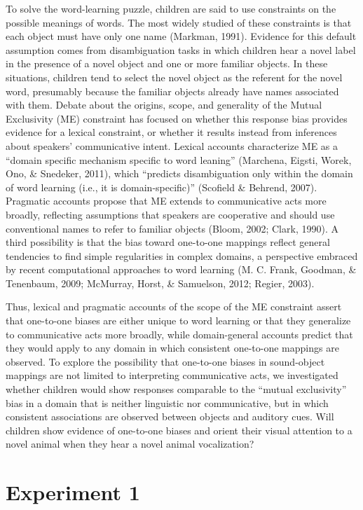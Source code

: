 \documentclass[english,floatsintext,man]{apa6}
\theoremstyle{definition}
\theoremstyle{definition}
\theoremstyle{definition}
\theoremstyle{remark}
\begin{document}
To solve the word-learning puzzle, children are said to use constraints
on the possible meanings of words. The most widely studied of these
constraints is that each object must have only one name (Markman, 1991).
Evidence for this default assumption comes from disambiguation tasks in
which children hear a novel label in the presence of a novel object and
one or more familiar objects. In these situations, children tend to
select the novel object as the referent for the novel word, presumably
because the familiar objects already have names associated with them.
Debate about the origins, scope, and generality of the Mutual
Exclusivity (ME) constraint has focused on whether this response bias
provides evidence for a lexical constraint, or whether it results
instead from inferences about speakers' communicative intent. Lexical
accounts characterize ME as a \enquote{domain specific mechanism
specific to word leaning} (Marchena, Eigsti, Worek, Ono, \& Snedeker,
2011), which \enquote{predicts disambiguation only within the domain of
word learning (i.e., it is domain-specific)} (Scofield \& Behrend,
2007). Pragmatic accounts propose that ME extends to communicative acts
more broadly, reflecting assumptions that speakers are cooperative and
should use conventional names to refer to familiar objects (Bloom, 2002;
Clark, 1990). A third possibility is that the bias toward one-to-one
mappings reflect general tendencies to find simple regularities in
complex domains, a perspective embraced by recent computational
approaches to word learning (M. C. Frank, Goodman, \& Tenenbaum, 2009;
McMurray, Horst, \& Samuelson, 2012; Regier, 2003).

Thus, lexical and pragmatic accounts of the scope of the ME constraint
assert that one-to-one biases are either unique to word learning or that
they generalize to communicative acts more broadly, while domain-general
accounts predict that they would apply to any domain in which consistent
one-to-one mappings are observed. To explore the possibility that
one-to-one biases in sound-object mappings are not limited to
interpreting communicative acts, we investigated whether children would
show responses comparable to the \enquote{mutual exclusivity} bias in a
domain that is neither linguistic nor communicative, but in which
consistent associations are observed between objects and auditory cues.
Will children show evidence of one-to-one biases and orient their visual
attention to a novel animal when they hear a novel animal vocalization?

\section{Experiment 1}\label{experiment-1}
\end{document}
